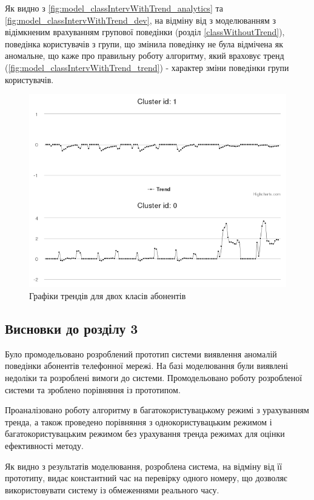 Як видно з \autoref{fig:model_classIntervWithTrend_analytics} та \autoref{fig:model_classIntervWithTrend_dev}, на відміну від з моделюванням з відімкненим врахуванням групової поведінки (розділ \ref{classWithoutTrend}), поведінка користувачів з групи, що змінила поведінку не була відмічена як аномальне, що каже про правильну роботу алгоритму, який враховує тренд (\autoref{fig:model_classIntervWithTrend_trend}) - характер зміни поведінки групи користувачів.

\begin{figure}[h!]
        \begin{center}
            \includegraphics[scale=0.55]{resources/classIntervWithTrend/trend.png}
        \end{center}
        \caption{Графіки трендів для двох класів абонентів}
        \label{fig:model_classIntervWithTrend_trend}
\end{figure}

\clearpage
\subsection*{Висновки до розділу 3}

Було промодельовано розроблений прототип системи виявлення аномалій поведінки абонентів телефонної мережі. На базі моделювання були виявлені недоліки та розроблені вимоги до системи. Промодельовано роботу розробленої системи та зроблено порівняння із прототипом.

Проаналізовано роботу алгоритму в багатокористувацькому режимі з урахуванням тренда, а також проведено порівняння з однокористувацьким режимом і багатокористувацьким режимом без урахування тренда режимах для оцінки ефективності методу.

Як видно з результатів моделювання, розроблена система, на відміну від її прототипу, видає константний час на перевірку одного номеру, що дозволяє використовувати систему із обмеженнями реального часу.
